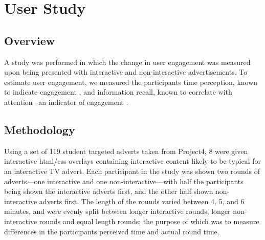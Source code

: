 \section{User Study}
	\subsection{Overview}
	A study was performed in which the change in user engagement was measured upon being presented with interactive and non-interactive advertisements. To estimate user engagement, we measured the participants time perception, known to indicate engagement \citep{yahoo-intrusive-advertising}, and information recall, known to correlate with attention \citep{interactions_attention_memory}--an indicator of engagement \cite{what_is_engagement}.

	\subsection{Methodology}
	Using a set of 119 student targeted adverts taken from Project4, 8 were given interactive html/css overlays containing interactive content likely to be typical for an interactive TV advert. Each participant in the study was shown two rounds of adverts---one interactive and one non-interactive---with half the participants being shown the interactive adverts first, and the other half shown non-interactive adverts first. The length of the rounds varied between 4, 5, and 6 minutes, and were evenly split between longer interactive rounds, longer non-interactive rounds and equal length rounds; the purpose of which was to measure differences in the participants perceived time and actual round time. 

